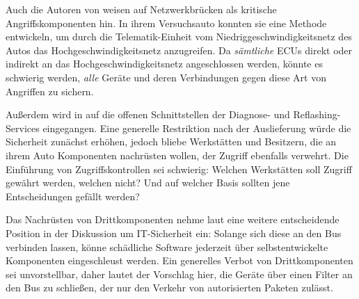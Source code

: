 \documentclass[
    fontsize=12pt,
    headings=small,
    parskip=half,           %
    bibliography=totoc,
    numbers=noenddot,       %
    open=any,               %
    ]{scrreprt}
\begin{document}
Auch die Autoren von \cite{KCR10} weisen auf Netzwerkbrücken als kritische Angriffskomponenten hin. In ihrem Versuchsauto konnten sie eine Methode entwickeln, um durch die Telematik-Einheit vom Niedriggeschwindigkeitsnetz des Autos das Hochgeschwindigkeitsnetz anzugreifen. Da \textit{sämtliche} ECUs direkt oder indirekt an das Hochgeschwindigkeitsnetz angeschlossen werden, könnte es schwierig werden, \textit{alle} Geräte und deren Verbindungen gegen diese Art von Angriffen zu sichern.\par
Außerdem wird in \cite{KCR10} auf die offenen Schnittstellen der Diagnose- und Reflashing-Services eingegangen. Eine generelle Restriktion nach der Auslieferung würde die Sicherheit zunächst erhöhen, jedoch bliebe Werkstätten und Besitzern, die an ihrem Auto Komponenten nachrüsten wollen, der Zugriff ebenfalls verwehrt. Die Einführung von Zugriffskontrollen sei schwierig: Welchen Werkstätten soll Zugriff gewährt werden, welchen nicht? Und auf welcher Basis sollten jene Entscheidungen gefällt werden?\par
Das Nachrüsten von Drittkomponenten nehme laut \cite{KCR10} eine weitere entscheidende Position in der Diskussion um IT-Sicherheit ein: Solange sich diese an den Bus verbinden lassen, könne schädliche Software jederzeit über selbstentwickelte Komponenten eingeschleust werden. Ein generelles Verbot von Drittkomponenten sei unvorstellbar, daher lautet der Vorschlag hier, die Geräte über einen Filter an den Bus zu schließen, der nur den Verkehr von autorisierten Paketen zulässt.
\end{document}
